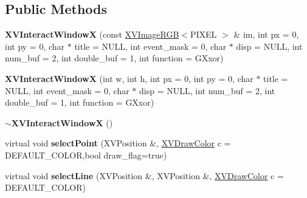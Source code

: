 \subsection*{Public Methods}
\begin{CompactItemize}
\item 
\label{XVInteractWindowX_a0}
\hypertarget{class_XVInteractWindowX_a0}{
{\bf XVInteract\-Window\-X} (const \hyperlink{class_XVImageRGB}{XVImage\-RGB}$<$PIXEL $>$ \& im, int px = 0, int py = 0, char $\ast$ title = NULL, int event\_\-mask = 0, char $\ast$ disp = NULL, int num\_\-buf = 2, int double\_\-buf = 1, int function = GXxor)}

\item 
\label{XVInteractWindowX_a1}
\hypertarget{class_XVInteractWindowX_a1}{
{\bf XVInteract\-Window\-X} (int w, int h, int px = 0, int py = 0, char $\ast$ title = NULL, int event\_\-mask = 0, char $\ast$ disp = NULL, int num\_\-buf = 2, int double\_\-buf = 1, int function = GXxor)}

\item 
\label{XVInteractWindowX_a2}
\hypertarget{class_XVInteractWindowX_a2}{
{\bf $\sim$XVInteract\-Window\-X} ()}

\item 
\label{XVInteractWindowX_a3}
\hypertarget{class_XVInteractWindowX_a3}{
virtual void {\bf select\-Point} (XVPosition \&, \hyperlink{class_XVDrawColor}{XVDraw\-Color} c = DEFAULT\_\-COLOR,bool draw\_\-flag=true)}

\item 
\label{XVInteractWindowX_a4}
\hypertarget{class_XVInteractWindowX_a4}{
virtual void {\bf select\-Line} (XVPosition \&, XVPosition \&, \hyperlink{class_XVDrawColor}{XVDraw\-Color} c = DEFAULT\_\-COLOR)}


\end{CompactItemize}
